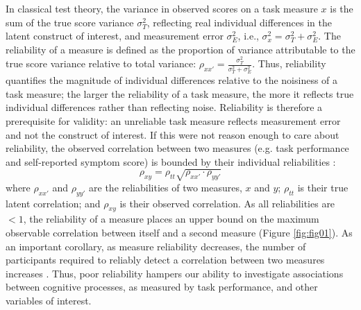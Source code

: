 \documentclass[a4paper,12pt]{article}
\begin{document}
In classical test theory, the variance in observed scores on a task measure $x$ is the sum of the true score variance $\sigma^2_T$, reflecting real individual differences in the latent construct of interest, and measurement error $\sigma^2_E$, i.e., $\sigma^2_x = \sigma^2_T + \sigma^2_E$. The reliability of a measure is defined as the proportion of variance attributable to the true score variance relative to total variance: $\rho_{xx'} = \frac{\sigma^2_T}{\sigma^2_T + \sigma^2_E}$. Thus, reliability quantifies the magnitude of individual differences relative to the noisiness of a task measure; the larger the reliability of a task measure, the more it reflects true individual differences rather than reflecting noise. Reliability is therefore a prerequisite for validity: an unreliable task measure reflects measurement error and not the construct of interest. If this were not reason enough to care about reliability, the observed correlation between two measures (e.g. task performance and self-reported symptom score) is bounded by their individual reliabilities \cite{Spearman1904-mo}: 
\begin{equation}
    \rho_{xy} = \rho_{tt} \sqrt{\rho_{xx'} \cdot \rho_{yy'}}
\end{equation}
where $\rho_{xx'}$ and $\rho_{yy'}$ are the reliabilities of two measures, $x$ and $y$; $\rho_{tt}$ is their true latent correlation; and  $\rho_{xy}$ is their observed correlation. As all reliabilities are $<1$, the reliability of a measure places an upper bound on the maximum observable correlation between itself and a second measure (Figure \ref{fig:fig01}). As an important corollary, as measure reliability decreases, the number of participants required to reliably detect a correlation between two measures increases \cite{Parsons2019-jw}. Thus, poor reliability hampers our ability to investigate associations between cognitive processes, as measured by task performance, and other variables of interest. 
\end{document}
